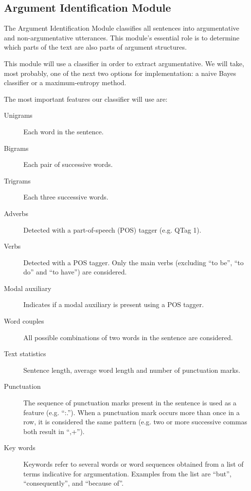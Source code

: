 \documentclass[lnbip]{svmultln}
\begin{document}
\subsection{Argument Identification Module}
\par
The Argument Identification Module classifies all sentences into argumentative and non-argumentative utterances. This module’s essential role is to determine which parts of the text are also parts of argument structures.
\par
This module will use a classifier in order to extract argumentative. We will take, most probably, one of the next two options for implementation: a naive Bayes classifier or a maximum-entropy method.
\par
The most important features our classifier will use are:
\begin{description}
\item[Unigrams] Each word in the sentence.
\item[Bigrams] Each pair of successive words.
\item[Trigrams] Each three successive words.
\item[Adverbs] Detected with a part-of-speech (POS) tagger (e.g. QTag 1).
\item[Verbs] Detected with a POS tagger. Only the main verbs (excluding ``to be'', ``to do'' and ``to have'') are considered.
\item[Modal auxiliary] Indicates if a modal auxiliary is present using a POS tagger.
\item[Word couples] All possible combinations of two words in the sentence are considered.
\item[Text statistics] Sentence length, average word length and number of punctuation marks.
\item[Punctuation] The sequence of punctuation marks present in the sentence is used as a feature (e.g. ``:.''). When a punctuation mark occurs more than once in a row, it is considered the same pattern (e.g. two or more successive commas both result in ``,+'').
\item[Key words] Keywords refer to several words or word sequences obtained from a list of terms indicative for argumentation. Examples from the list are ``but'', ``consequently'', and ``because of''.
\end{description}
\end{document}
